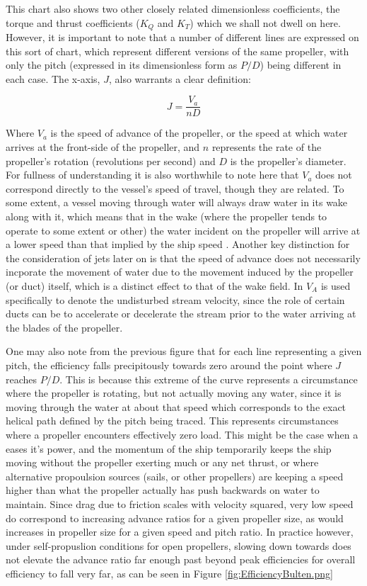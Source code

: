 \documentclass{article}\usepackage[]{graphicx}\usepackage[]{color}
\begin{document}
This chart also shows two other closely related dimensionless coefficients, the torque and thrust coefficients ($K_Q$ and $K_T$) which we shall not dwell on here.  However, it is important to note that a number of different lines are expressed on this sort of chart, which represent different versions of the same propeller, with only the pitch (expressed in its dimensionless form as $P/D$) being different in each case. The x-axis, $J$, also warrants a clear definition:

\begin{equation}
\label{eq:2}
J = \frac{V_a}{nD}
\end{equation}

Where $V_a$ is the speed of advance of the propeller, or the speed at which water arrives at the front-side of the propeller, and $n$ represents the rate of the propeller's rotation (revolutions per second) and $D$ is the propeller's diameter.  For fullness of understanding it is also worthwhile to note here that $V_a$ does not correspond directly to the vessel's speed of travel, though they are related. To some extent, a vessel moving through water will always draw water in its wake along with it, which means that in the wake (where the propeller tends to operate to some extent or other) the water incident on the propeller will arrive at a lower speed than that implied by the ship speed \parencite[15]{MAN2017}.  Another key distinction for the consideration of jets later on is that the speed of advance does not necessarily incporate the movement of water due to the movement induced by the propeller (or duct) itself, which is a distinct effect to that of the wake field. In \cite[213]{lewis1988} $V_A$ is used specifically to denote the undisturbed stream velocity, since the role of certain ducts can be to accelerate or decelerate the stream prior to the water arriving at the blades of the propeller.

One may also note from the previous figure that for each line representing a given pitch, the efficiency falls precipitously towards zero around the point where $J$ reaches $P/D$. This is because this extreme of the curve represents a circumstance where the propeller is rotating, but not actually moving any water, since it is moving through the water at about that speed which corresponds to the exact helical path defined by the pitch being traced. This represents circumstances where a propeller encounters effectively zero load.  This might be the case when a eases it's power, and the momentum of the ship temporarily keeps the ship moving without the propeller exerting much or any net thrust, or where alternative propoulsion sources (sails, or other propellers) are keeping a speed higher than what the propeller actually has push backwards on water to maintain.  Since drag due to friction scales with velocity squared, very low speed do correspond to increasing advance ratios for a given propeller size, as would increases in propeller size for a given speed and pitch ratio. In practice however, under self-propuslion conditions for open propellers, slowing down towards does not elevate the advance ratio far enough past beyond peak efficiencies for overall efficiency to fall very far, as can be seen in Figure \ref{fig:EfficiencyBulten.png}
\end{document}

